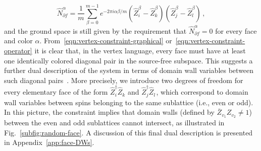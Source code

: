 %
%
\begin{equation}
    \hat{N}_{\partial f}^{\alpha} = \frac{1}{m} \sum_{\beta=0}^{m-1} e^{-2\pi i \alpha \beta / m} (\hat{Z}_{i}^\beta - \hat{Z}_{k}^\beta)(\hat{Z}_{j}^\beta - \hat{Z}_{l}^\beta)
    \, ,
    \label{eqn:vertex-constraint-operator}
\end{equation}
%
%
and the ground space is still given by the requirement that $\hat{N}_{\partial f}^{\alpha} = 0$ for every face and color $\alpha$. 
From~\eqref{eqn:vertex-constraint-graphical} or~\eqref{eqn:vertex-constraint-operator} it is clear that, in the vertex language, every face must have at least one identically colored diagonal pair in the source-free subspace. This suggests a further dual description of the system in terms of domain wall variables between such diagonal pairs~\cite{Stephen2022Robust}. More precisely, we introduce two degrees of freedom for every elementary face of the form $\hat{Z}^\dagger_i\hat{Z}_k^{\phantom{\dagger}}$ and $\hat{Z}_{j}^\dagger \hat{Z}_{l}^{\phantom{\dagger}}$, which correspond to domain wall variables between spins belonging to the same sublattice (i.e., even or odd). In this picture, the constraint implies that domain walls (defined by $\bar{Z}_{v_1} {Z}_{v_2} \neq 1$) between the even and odd sublattices cannot intersect, as illustrated in Fig.~\ref{subfig:random-face}. A discussion of this final dual description is presented in Appendix~\ref{app:face-DWs}.


